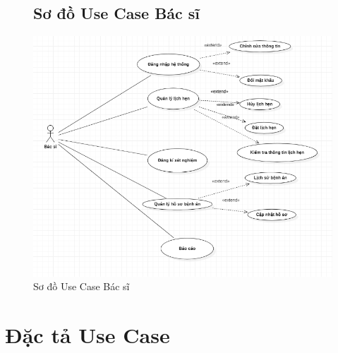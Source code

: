 \documentclass{report}
\begin{document}
\begin{center}
	\begin{figure}[!htp]
		\subsection{Sơ đồ Use Case Bác sĩ}
		\begin{center}
			\includegraphics[scale=.6]{Hinh/Sơ đồ Use Case Bác sĩ.png}
		\end{center}
		\caption{Sơ đồ Use Case Bác sĩ}
	\end{figure}
\end{center}



\pagebreak
\section{Đặc tả Use Case}
\end{document}
